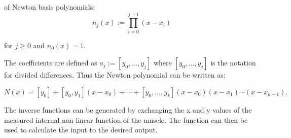 \documentclass[main]{subfiles}
\begin{document}
of Newton basis polynomials:
\[
n_j(x) := \prod_{i=0}^{j-1} (x - x_i)
\]

for $j \ge 0$ and $n_0(x) = 1$.

The coefficients are defined as $a_j := [y_0,\ldots,y_j]$ where $[y_0,\ldots,y_j]$ is the notation for divided differences. Thus the Newton polynomial can be written as:

\[
N(x) = [y_0] + [y_0,y_1](x-x_0) + \cdots + [y_0,\ldots,y_k](x-x_0)(x-x_1)\cdots(x-x_{k-1}).
\]

\begin{comment}
The Newton Polynomial above can be expressed in a simplified form when $x_0, x_1, \dots, x_k$ are arranged consecutively with equal space. Introducing the notation $h = x_{i+1}-x_i$ for each $i=0,1,\dots,k-1$ and $x=x_0+sh<$, the difference $x-x_i$ can be written as $(s-i)h$. So the Newton Polynomial above becomes:

\[
\begin{aligned}
N(x) &= [y_0] + [y_0,y_1]sh + \cdots + [y_0,\ldots,y_k] s (s-1) \cdots (s-k+1){h}^{k} \\
&= \sum_{i=0}^{k}s(s-1) \cdots (s-i+1){h}^{i}[y_0,\ldots,y_i] \\
&= \sum_{i=0}^{k}{s \choose i}i!{h}^{i}[y_0,\ldots,y_i]
\end{aligned}
\]

is called the Newton Forward Divided Difference Formula.

If the nodes are reordered as ${x}_{k},{x}_{k-1},\dots,{x}_{0}$, the Newton Polynomial becomes:

\[
N(x)=[y_k]+[{y}_{k}, {y}_{k-1}](x-{x}_{k})+\cdots+[{y}_{k},\ldots,{y}_{0}](x-{x}_{k})(x-{x}_{k-1})\cdots(x-{x}_{1})
\]

If ${x}_{k},\;{x}_{k-1},\;\dots,\;{x}_{0}$ are equally spaced with $x={x}_{k}+sh$ and ${x}_{i}={x}_{k}-(k-i)h$ for $i = 0, 1, \ldots, k$, then:

\[
\begin{aligned}
N(x) &= [{y}_{k}]+ [{y}_{k}, {y}_{k-1}]sh+\cdots+[{y}_{k},\ldots,{y}_{0}]s(s+1)\cdots(s+k-1){h}^{k} \\
&=\sum_{i=0}^{k}{(-1)}^{i}{-s \choose i}i!{h}^{i}[{y}_{k},\ldots,{y}_{k-i}]
\end{aligned}
\]

is called the Newton Backward Divided Difference Formula.
\end{comment}

The inverse functions can be generated by exchanging the x and y values of the measured internal non-linear function of the muscle. The function can then be used to calculate the input to the desired output.
\end{document}
